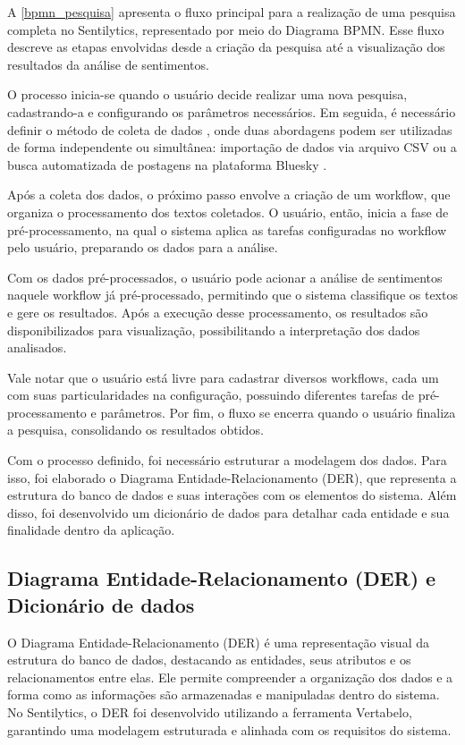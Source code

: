 \documentclass[
	12pt,				%
	oneside,			%
	a4paper,			%
	english,			%
	french,				%
	spanish,			%
	brazil				%
	]{abntex2}
\begin{document}
A \autoref{bpmn_pesquisa} apresenta o fluxo principal para a realização
de uma pesquisa completa no Sentilytics, representado por meio do
Diagrama BPMN. Esse fluxo descreve as etapas envolvidas desde a criação
da pesquisa até a visualização dos resultados da análise de sentimentos.

O processo inicia-se quando o usuário decide realizar uma nova pesquisa,
cadastrando-a e configurando os parâmetros necessários. Em seguida, é
necessário definir o método de coleta de dados , onde duas abordagens
podem ser utilizadas de forma independente ou simultânea: importação de
dados via arquivo CSV ou a busca automatizada de postagens na plataforma
Bluesky .

Após a coleta dos dados, o próximo passo envolve a criação de um
workflow, que organiza o processamento dos textos coletados. O usuário,
então, inicia a fase de pré-processamento, na qual o sistema aplica as
tarefas configuradas no workflow pelo usuário, preparando os dados para
a análise.

Com os dados pré-processados, o usuário pode acionar a análise de
sentimentos naquele workflow já pré-processado, permitindo que o sistema
classifique os textos e gere os resultados. Após a execução desse
processamento, os resultados são disponibilizados para visualização,
possibilitando a interpretação dos dados analisados.

Vale notar que o usuário está livre para cadastrar diversos workflows,
cada um com suas particularidades na configuração, possuindo diferentes
tarefas de pré-processamento e parâmetros. Por fim, o fluxo se encerra
quando o usuário finaliza a pesquisa, consolidando os resultados
obtidos.

Com o processo definido, foi necessário estruturar a modelagem dos
dados. Para isso, foi elaborado o Diagrama Entidade-Relacionamento
(DER), que representa a estrutura do banco de dados e suas interações
com os elementos do sistema. Além disso, foi desenvolvido um dicionário
de dados para detalhar cada entidade e sua finalidade dentro da
aplicação.

\hypertarget{diagrama-entidade-relacionamento-der-e-dicionuxe1rio-de-dados}{%
\subsection{Diagrama Entidade-Relacionamento (DER) e Dicionário de
dados}\label{diagrama-entidade-relacionamento-der-e-dicionuxe1rio-de-dados}}

O Diagrama Entidade-Relacionamento (DER) é uma representação visual da
estrutura do banco de dados, destacando as entidades, seus atributos e
os relacionamentos entre elas. Ele permite compreender a organização dos
dados e a forma como as informações são armazenadas e manipuladas dentro
do sistema. No Sentilytics, o DER foi desenvolvido utilizando a
ferramenta Vertabelo, garantindo uma modelagem estruturada e alinhada
com os requisitos do sistema.
\end{document}

